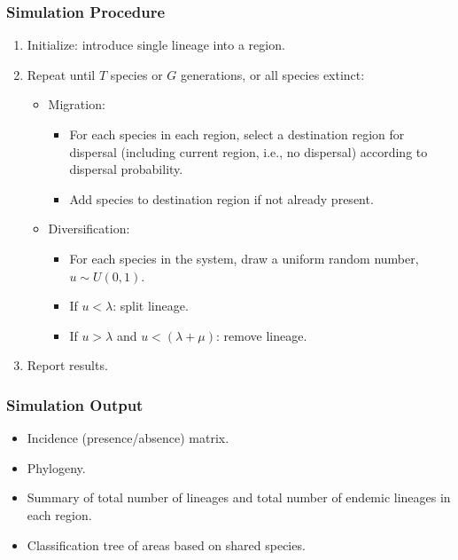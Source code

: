 \documentclass[11pt,t]{beamer}
\begin{document}
\begin{frame}
	\frametitle{Simulation Procedure}
	\begin{enumerate}
		\item Initialize: introduce single lineage into a region.
		\item Repeat until $T$ species or $G$ generations, or all species extinct:
			\begin{itemize}
				\item Migration:			
				\begin{itemize} 
					\item For each species in each region, select a destination region for dispersal (including current region, i.e., no dispersal) according to dispersal probability.
					\item Add species to destination region if not already present.
				\end{itemize}
			
				\item Diversification:
				\begin{itemize}	 
					\item For each species in the system, draw a uniform random number, $u \sim U(0,1)$.					
					\item If $u < \lambda$: split lineage.
					\item If $u > \lambda$ and $u < (\lambda + \mu)$: remove lineage.
				\end{itemize}	
			\end{itemize}
		\item Report results.					
	\end{enumerate}
\end{frame}

\begin{frame}
	\frametitle{Simulation Output}
	\begin{itemize}
		\item Incidence (presence/absence) matrix.
		\item Phylogeny.
		\item Summary of total number of lineages and total number of endemic lineages in each region.
		\item Classification tree of areas based on shared species.
	\end{itemize}
\end{frame}
\end{document}
